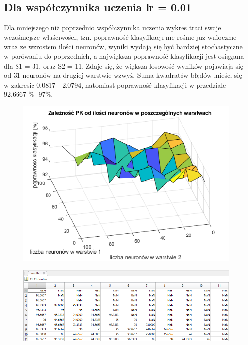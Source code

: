 \documentclass[a4paper, 12pt]{report}
\begin{document}
\subsection{Dla współczynnika uczenia lr = 0.01}
Dla mniejszego niż poprzednio współczynnika uczenia wykres traci swoje wcześniejsze właściwości, tzn. poprawność klasyfikacji nie rośnie już widocznie wraz ze wzrostem ilości neuronów, wyniki wydają się być bardziej stochastyczne w porówaniu do poprzednich, a największa poprawność klasyfikacji jest osiągana dla S1 = 31, oraz S2 = 11. Zdaje się, że większa losowość wyników pojawiaja się od 31 neuronów na drugiej warstwie wzwyż. Suma kwadratów błędów mieści się w zakresie 0.0817 - 2.0794, natomiast poprawność klasyfikacji w przedziale 92.6667 \%- 97\%.
\begin{figure}[hbt!]
\includegraphics[width=14cm]{lr2 pk}
\centering
\end{figure}
\begin{figure}[hbt!]

\includegraphics[width=14cm]{lr2 pk dane}
\centering
\end{figure}
\end{document}
